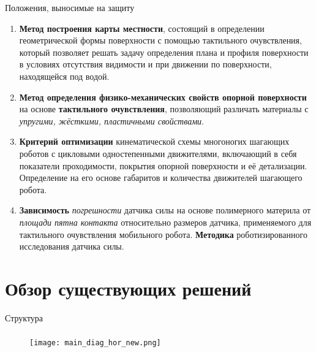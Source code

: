 \begin{frame}{Положения, выносимые на защиту}
    \begin{enumerate}
        \vspace{-0.3cm}
        \small
        \item \textbf{Метод построения карты местности}, состоящий в определении геометрической формы поверхности с помощью тактильного очувствления, который позволяет решать задачу определения плана и профиля поверхности в условиях отсутствия видимости и при движении по поверхности, находящейся под водой.
        \item \textbf{Метод определения физико-механических свойств опорной поверхности} на основе \textbf{тактильного очувствления}, позволяющий различать материалы с \textit{упругими, жёсткими, пластичными свойствами}.
        \item \textbf{Критерий оптимизации} кинематической схемы многоногих шагающих роботов с цикловыми одностепенными движителями, включающий в себя показатели проходимости, покрытия опорной поверхности и её детализации. Определение на его основе габаритов и количества движителей шагающего робота.
        \item \textbf{Зависимость} \textit{погрешности} датчика силы на основе полимерного материла от \textit{площади пятна контакта} относительно размеров датчика, применяемого для тактильного очувствления мобильного робота. \textbf{Методика} роботизированного исследования датчика силы.
    \end{enumerate}
\end{frame}


\section{Обзор существующих решений}

\begin{frame}[t]{Структура}
    \framesubtitle{}
    \begin{figure}[H]
        \centering\texttt{[image: main\_diag\_hor\_new.png]}
    \end{figure}
\end{frame}


